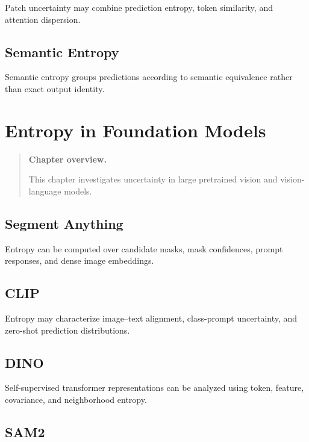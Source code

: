\documentclass[11pt,oneside]{book}
\theoremstyle{remark}
\newenvironment{chapteroverview}
{
	\begin{quote}
		\small
		\textbf{Chapter overview.}
	}
	{
	\end{quote}
}
\begin{document}
	Patch uncertainty may combine prediction entropy, token similarity, and
	attention dispersion.
	
	\section{Semantic Entropy}
	
	Semantic entropy groups predictions according to semantic equivalence rather
	than exact output identity.
	
	
	\chapter{Entropy in Foundation Models}
	\label{chap:foundation-entropy}
	
	\begin{chapteroverview}
		This chapter investigates uncertainty in large pretrained vision and
		vision-language models.
	\end{chapteroverview}
	
	\section{Segment Anything}
	
	Entropy can be computed over candidate masks, mask confidences, prompt
	responses, and dense image embeddings.
	
	\section{CLIP}
	
	Entropy may characterize image--text alignment, class-prompt uncertainty, and
	zero-shot prediction distributions.
	
	\section{DINO}
	
	Self-supervised transformer representations can be analyzed using token,
	feature, covariance, and neighborhood entropy.
	
	\section{SAM2}
	
\end{document}
